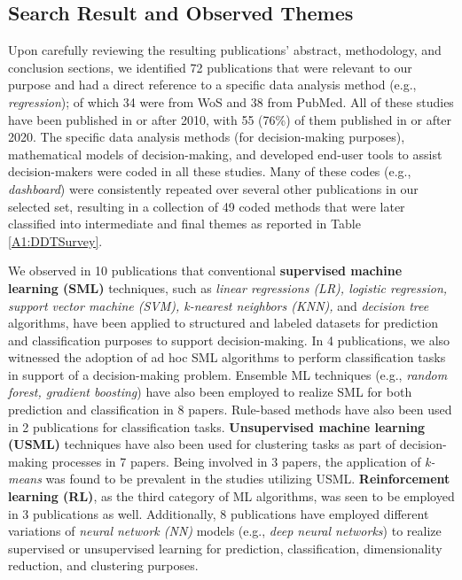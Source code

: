 \documentclass{sfuthesis}
\begin{document}
\subsection{Search Result and Observed Themes}
Upon carefully reviewing the resulting publications’ abstract, methodology, and conclusion sections, we identified 72 publications that were relevant to our purpose and had a direct reference to a specific data analysis method (e.g., \textit{regression}); of which 34 were from WoS and 38 from PubMed. All of these studies have been published in or after 2010, with 55 (76\%) of them published in or after 2020. The specific data analysis methods (for decision-making purposes), mathematical models of decision-making, and developed end-user tools to assist decision-makers were coded in all these studies. Many of these codes (e.g., \textit{dashboard}) were consistently repeated over several other publications in our selected set, resulting in a collection of 49 coded methods that were later classified into intermediate and final themes as reported in Table \ref{A1:DDTSurvey}.\par
We observed in 10 publications that conventional \textbf{supervised machine learning (SML)} techniques, such as \textit{linear regressions (LR), logistic regression, support vector machine (SVM), k-nearest neighbors (KNN),} and \textit{decision tree} algorithms, have been applied to structured and labeled datasets for prediction and classification purposes to support decision-making. In 4 publications, we also witnessed the adoption of ad hoc SML algorithms to perform classification tasks in support of a decision-making problem. Ensemble ML techniques (e.g., \textit{random forest, gradient boosting}) have also been employed to realize SML for both prediction and classification in 8 papers. Rule-based methods have also been used in 2 publications for classification tasks. \textbf{Unsupervised machine learning (USML)} techniques have also been used for clustering tasks as part of decision-making processes in 7 papers. Being involved in 3 papers, the application of \textit{k-means} was found to be prevalent in the studies utilizing USML. \textbf{Reinforcement learning (RL)}, as the third category of ML algorithms, was seen to be employed in 3 publications as well. Additionally, 8 publications have employed different variations of \textit{neural network (NN)} models (e.g., \textit{deep neural networks}) to realize supervised or unsupervised learning for prediction, classification, dimensionality reduction, and clustering purposes.\par  
\end{document}
